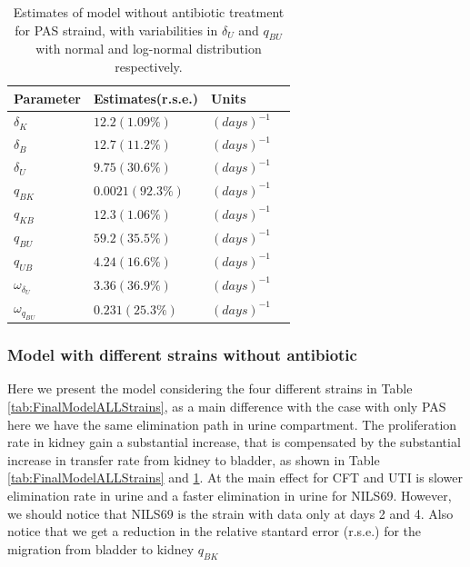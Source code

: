 \documentclass{article}
\begin{document}
\begin{table}
	\begin{tabular}{|l|l|l|l|}
		\hline
		Parameter & Estimates(r.s.e.) & Units\\ \hline
		$\delta_{K}$ & $12.2(1.09\%)$ & $(days)^{-1}$\\
		$\delta_{B}$ & $12.7(11.2\%)$ & $(days)^{-1}$\\
		$\delta_{U}$ & $9.75(30.6\%)$ & $(days)^{-1}$\\
		$q_{BK}$ & $0.0021(92.3\%)$ & $(days)^{-1}$\\
		$q_{KB}$ & $12.3(1.06\%)$ & $(days)^{-1}$\\
		$q_{BU}$ & $59.2(35.5\%)$ & $(days)^{-1}$\\
		$q_{UB}$ & $4.24(16.6\%)$ & $(days)^{-1}$\\
		$\omega_{\delta_{U}}$ & $3.36(36.9\%)$ & $(days)^{-1}$\\
		$\omega_{q_{BU}}$ & $0.231(25.3\%)$ & $(days)^{-1}$\\
		\hline
	\end{tabular}
\label{tab:FinalModelPAS}
	\caption{Estimates of model without antibiotic treatment for PAS straind, with variabilities in $\delta_U$ and $q_{BU}$ with normal and log-normal distribution respectively.}
\end{table}



\subsubsection{Model with different strains without antibiotic}

Here we present the model considering the four different strains in Table \ref{tab:FinalModelALLStrains}, as a main difference with the case with only PAS here we have the same elimination path in urine compartment. The proliferation rate in kidney gain a substantial increase, that is compensated by the substantial increase in transfer rate from kidney to bladder, as shown in Table \ref{tab:FinalModelALLStrains} and \ref{tab:FinalModelPAS}. At the main effect for CFT and UTI is slower elimination rate in urine and a faster elimination in urine for NILS69. However, we should notice that NILS69 is the strain with data only at days 2 and 4. Also notice that we get a reduction in the relative stantard error (r.s.e.) for the migration from bladder to kidney $q_{BK}$
\end{document}
